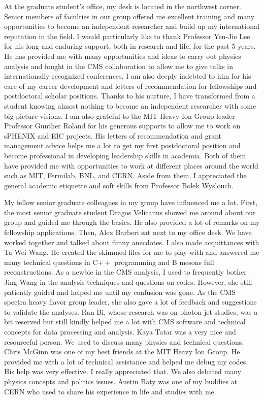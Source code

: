At the graduate student's office, my desk is located in the northwest corner. Senior members of faculties in our group offered me excellent training and many opportunities to become an independent researcher and build up my international reputation in the field. I would particularly like to thank Professor Yen-Jie Lee for his long and enduring support, both in research and life, for the past 5 years. He has provided me with many opportunities and ideas to carry out physics analysis and fought in the CMS collaboration to allow me to give talks in internationally recognized conferences. I am also deeply indebted to him for his care of my career development and letters of recommendation for fellowships and postdoctoral scholar positions. Thanks to his nurture, I have transformed from a student knowing almost nothing to become an independent researcher with some big-picture visions. I am also grateful to the MIT Heavy Ion Group leader Professor Gunther Roland for his generous supports to allow me to work on sPHENIX and EIC projects. His letters of recommendation and grant management advice helps me a lot to get my first postdoctoral position and become professional in developing leadership skills in academia. Both of them have provided me with opportunities to work at different places around the world such as MIT, Fermilab, BNL, and CERN. Aside from them, I appreciated the general academic etiquette and soft skills from Professor Bolek Wyslouch.


My fellow senior graduate colleagues in my group have influenced me a lot. First, the most senior graduate student Dragos Velicanus showed me around about our group and guided me through the basics. He also provided a lot of remarks on my fellowship applications. Then, Alex Barberi sat next to my office desk. We have worked together and talked about funny anecdotes. I also made acquittances with Ta-Wei Wang. He created the skimmed files for me to play with and answered me many technical questions in C$++$ programming and B mesons full reconstructions. As a newbie in the CMS analysis, I used to frequently bother Jing Wang in the analysis techniques and questions on codes. However, she still patiently guided and helped me until my confusion was gone. As the CMS spectra heavy flavor group leader, she also gave a lot of feedback and suggestions to validate the analyses. Ran Bi, whose research was on photon-jet studies, was a bit reserved but still kindly helped me a lot with CMS software and technical concepts for data processing and analysis. Kaya Tatar was a very nice and resourceful person. We used to discuss many physics and technical questions. Chris McGinn was one of my best friends at the MIT Heavy Ion Group. He provided me with a lot of technical assistance and helped me debug my codes. His help was very effective. I really appreciated that. We also debated many physics concepts and politics issues. Austin Baty was one of my buddies at CERN who used to share his experience in life and studies with me.  

